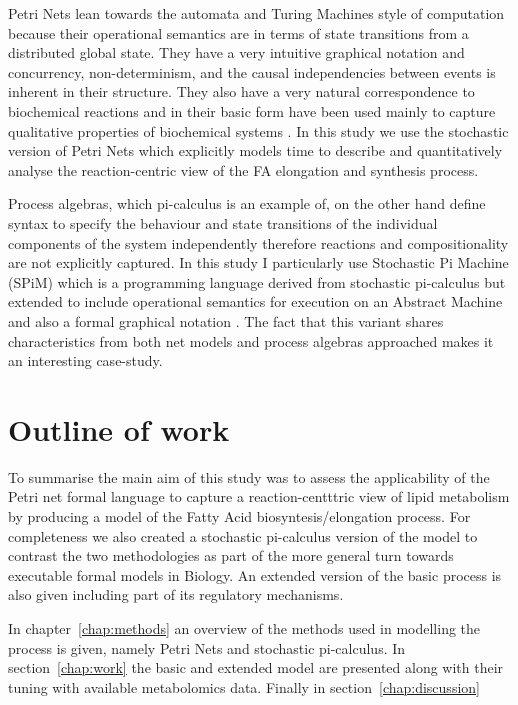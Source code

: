 Petri Nets lean towards the automata and Turing Machines style of
computation because their operational semantics are in terms of state
transitions from a distributed global state. They have a very intuitive
graphical notation and concurrency,
non-determinism, and the causal independencies between events is
inherent in their structure. They
also have a very natural correspondence to biochemical reactions and
in their basic form have been used mainly to capture qualitative properties
of biochemical systems \cite [] {baldan2010petri}. In this study we use the stochastic version of
Petri Nets which explicitly models time to describe and quantitatively
analyse the
reaction-centric view of the FA elongation and synthesis
process.

Process algebras, which pi-calculus is an example of, on the other
hand define syntax to specify the behaviour and state transitions of the individual
components of the system independently therefore reactions and
compositionality are not explicitly captured. In this study I
particularly use Stochastic Pi Machine (SPiM) which is a programming
language derived from stochastic pi-calculus but extended to include
operational semantics for execution on an Abstract Machine and also a
formal graphical notation \cite [] {export:65224, export:65223}. The
fact that this variant shares
characteristics from both net models and process algebras approached
makes it an interesting case-study.

\section{Outline of work}
To summarise the main aim of this study was to assess the
applicability of the Petri net formal language to capture a
reaction-centttric view of lipid metabolism by producing a model of the
Fatty Acid biosyntesis/elongation process. For completeness we also
created a stochastic pi-calculus version of the model to contrast the
two methodologies as part of the more general turn towards executable
formal models in Biology. An extended version of the basic process is
also given including part of its regulatory mechanisms.

In chapter~\ref{chap:methods} an overview of the methods used in
modelling the process is given, namely Petri Nets and stochastic
pi-calculus. In section~\ref{chap:work} the basic and extended model
are presented along with their tuning with available metabolomics
data. Finally in section~\ref{chap:discussion}

